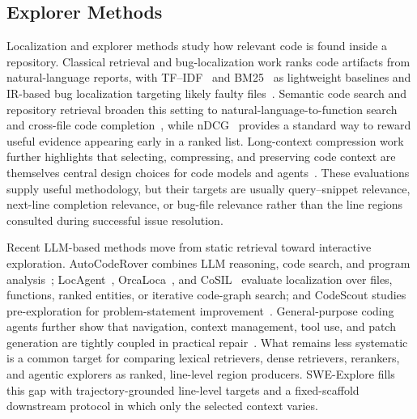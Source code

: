\documentclass{llmxive}
\begin{document}
\subsection{Explorer Methods}

Localization and explorer methods study how relevant code is found inside a repository. Classical retrieval and bug-localization work ranks code artifacts from natural-language reports, with TF--IDF~\citep{salton1988termweighting} and BM25~\citep{robertson2009bm25} as lightweight baselines and IR-based bug localization targeting likely faulty files~\citep{zhou2012buglocator}. Semantic code search and repository retrieval broaden this setting to natural-language-to-function search and cross-file code completion~\citep{husain2019codesearchnet,liu2024repobench}, while nDCG~\citep{jarvelin2002ndcg} provides a standard way to reward useful evidence appearing early in a ranked list. Long-context compression work further highlights that selecting, compressing, and preserving code context are themselves central design choices for code models and agents~\citep{shi2025longcodezip,wang2026context}. These evaluations supply useful methodology, but their targets are usually query--snippet relevance, next-line completion relevance, or bug-file relevance rather than the line regions consulted during successful issue resolution.

Recent LLM-based methods move from static retrieval toward interactive exploration. AutoCodeRover combines LLM reasoning, code search, and program analysis~\citep{zhang2024autocoderover}; LocAgent~\citep{chen2025locagent}, OrcaLoca~\citep{yu2025orcaloca}, and CoSIL~\citep{jiang2025issuelocalizationllmdriveniterative} evaluate localization over files, functions, ranked entities, or iterative code-graph search; and CodeScout studies pre-exploration for problem-statement improvement~\citep{suri2026codescout}. General-purpose coding agents further show that navigation, context management, tool use, and patch generation are tightly coupled in practical repair~\citep{yang2024sweagent,wang2024openhands,xia2024agentless,anthropic2025claudecode,chen2026beyondswecurrentcodeagent}. What remains less systematic is a common target for comparing lexical retrievers, dense retrievers, rerankers, and agentic explorers as ranked, line-level region producers. SWE-Explore fills this gap with trajectory-grounded line-level targets and a fixed-scaffold downstream protocol in which only the selected context varies.


\end{document}

